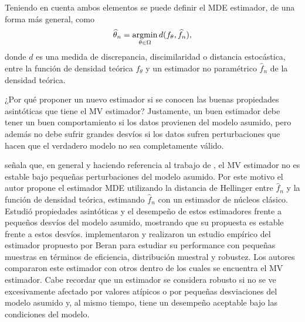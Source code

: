 %

Teniendo en cuenta ambos elementos se puede definir el MDE estimador, de una forma más general, como 
\begin{align}
\widehat{\theta}_n=\mathop{\rm argmin} \limits_{\theta\in\Omega} d(f_{\theta}, \widehat{f}_n),
\end{align}
donde $d$ es una medida de discrepancia, discimilaridad o distancia estocástica, entre la función de densidad teórica $f_{\theta}$ y un estimador no paramétrico $\widehat{f}_n$ de la densidad teórica.

¿Por qué proponer un nuevo estimador si se conocen las buenas propiedades asintóticas que tiene el MV estimador? Justamente, un buen estimador debe tener un buen comportamiento si los datos provienen del modelo asumido, pero además no debe sufrir grandes desvíos si los datos sufren perturbaciones que hacen que el verdadero modelo no sea completamente válido. 

\citet{beran1977} señala que, en general y haciendo referencia al trabajo de \citet{Huber1972}, el MV estimador no es estable bajo pequeñas perturbaciones del modelo asumido. Por este motivo el autor propone el estimador MDE utilizando la distancia de Hellinger entre $\widehat{f}_n$ y la función de densidad teórica, estimando $\widehat{f}_n$ con un estimador de núcleos clásico. Estudió propiedades asintóticas y el desempeño de estos estimadores frente a pequeños desvíos del modelo asumido, mostrando que su propuesta es estable frente a estos desvíos. \citet{Eslinger1990} implementaron y realizaron un estudio empírico del estimador propuesto por Beran para estudiar su performance con pequeñas muestras en términos de eficiencia, distribución muestral y robustez. Los autores compararon este estimador con otros dentro de los cuales se encuentra el MV estimador. Cabe recordar que un estimador se considera robusto si no se ve excesivamente afectado por valores atípicos o por pequeñas desviaciones del modelo asumido y, al mismo tiempo, tiene un desempeño aceptable bajo las condiciones del modelo.

